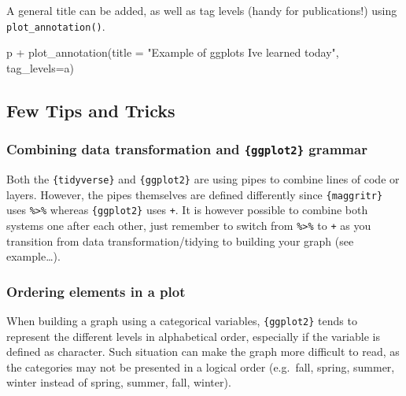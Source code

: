 \documentclass[
]{book}
\newenvironment{Shaded}{\begin{snugshade}}{\end{snugshade}}
\newcommand{\AttributeTok}[1]{\textcolor[rgb]{0.77,0.63,0.00}{#1}}
\newcommand{\FunctionTok}[1]{\textcolor[rgb]{0.00,0.00,0.00}{#1}}
\newcommand{\NormalTok}[1]{#1}
\newcommand{\SpecialCharTok}[1]{\textcolor[rgb]{0.00,0.00,0.00}{#1}}
\newcommand{\StringTok}[1]{\textcolor[rgb]{0.31,0.60,0.02}{#1}}
\begin{document}
A general title can be added, as well as tag levels (handy for publications!) using \texttt{plot\_annotation()}.

\begin{Shaded}
\begin{Highlighting}[]
\NormalTok{p }\SpecialCharTok{+} \FunctionTok{plot\_annotation}\NormalTok{(}\AttributeTok{title =} \StringTok{"Example of \textquotesingle{}ggplots\textquotesingle{} I\textquotesingle{}ve learned today"}\NormalTok{, }\AttributeTok{tag\_levels=}\StringTok{\textquotesingle{}a\textquotesingle{}}\NormalTok{)}
\end{Highlighting}
\end{Shaded}

\hypertarget{few-tips-and-tricks}{%
\subsection{Few Tips and Tricks}\label{few-tips-and-tricks}}

\hypertarget{combining-data-transformation-and-ggplot2-grammar}{%
\subsubsection{\texorpdfstring{Combining data transformation and \texttt{\{ggplot2\}} grammar}{Combining data transformation and \{ggplot2\} grammar}}\label{combining-data-transformation-and-ggplot2-grammar}}

Both the \texttt{\{tidyverse\}} and \texttt{\{ggplot2\}} are using pipes to combine lines of code or layers.
However, the pipes themselves are defined differently since \texttt{\{maggritr\}} uses \texttt{\%\textgreater{}\%} whereas \texttt{\{ggplot2\}} uses \texttt{+}.
It is however possible to combine both systems one after each other, just remember to switch from \texttt{\%\textgreater{}\%} to \texttt{+} as you transition from data transformation/tidying to building your graph (see example\ldots).

\hypertarget{ordering-elements-in-a-plot}{%
\subsubsection{Ordering elements in a plot}\label{ordering-elements-in-a-plot}}

When building a graph using a categorical variables, \texttt{\{ggplot2\}} tends to represent the different levels in alphabetical order, especially if the variable is defined as character. Such situation can make the graph more difficult to read, as the categories may not be presented in a logical order (e.g.~fall, spring, summer, winter instead of spring, summer, fall, winter).
\end{document}
